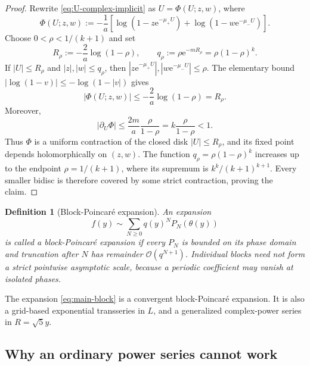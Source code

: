 \documentclass[11pt,oneside]{article}
\numberwithin{equation}{section}
\newtheorem{definition}[theorem]{Definition}
\newcommand{\e}{\mathrm{e}}
\newcommand{\bigO}{\mathcal{O}}
\begin{document}
\begin{proof}
Rewrite \cref{eq:U-complex-implicit} as \(U=\Phi(U;z,w)\), where
\begin{equation}
 \Phi(U;z,w):=-\frac1a\left[
 \log(1-z\e^{-\mu_+U})+\log(1-w\e^{-\mu_-U})
 \right].
\end{equation}
Choose \(0<\rho<1/(k+1)\) and set
\begin{equation}
 R_\rho:=-\frac2a\log(1-\rho),
 \qquad
 q_\rho:=\rho\e^{-mR_\rho}=\rho(1-\rho)^k.
\end{equation}
If \(|U|\le R_\rho\) and \(|z|,|w|\le q_\rho\), then
\(|z\e^{-\mu_+U}|,|w\e^{-\mu_-U}|\le\rho\).  The elementary bound
\(|\log(1-v)|\le-\log(1-|v|)\) gives
\begin{equation}
  |\Phi(U;z,w)|\le-\frac2a\log(1-\rho)=R_\rho.
\end{equation}
Moreover,
\begin{equation}
  |\partial_U\Phi|
  \le\frac{2m}{a}\frac{\rho}{1-\rho}
  =k\frac{\rho}{1-\rho}<1.
\end{equation}
Thus \(\Phi\) is a uniform contraction of the closed disk
\(|U|\le R_\rho\), and its fixed point depends holomorphically on
\((z,w)\).  The function \(q_\rho=\rho(1-\rho)^k\) increases up to the
endpoint \(\rho=1/(k+1)\), where its supremum is
\(k^k/(k+1)^{k+1}\).  Every smaller bidisc is therefore covered by some
strict contraction, proving the claim.
\end{proof}

\begin{definition}[Block-Poincar\'e expansion]
An expansion
\begin{equation}
  f(y)\sim\sum_{N\ge0}q(y)^N P_N(\theta(y))
\end{equation}
is called a \emph{block-Poincar\'e expansion} if every \(P_N\) is bounded on
its phase domain and truncation after \(N\) has remainder
\(\bigO(q^{N+1})\).  Individual blocks need not form a strict pointwise
asymptotic scale, because a periodic coefficient may vanish at isolated phases.
\end{definition}

The expansion \cref{eq:main-block} is a convergent block-Poincar\'e expansion.
It is also a grid-based exponential transseries in \(L\), and a generalized
complex-power series in \(R=\sqrt5y\).

\subsection{Why an ordinary power series cannot work}
\end{document}
